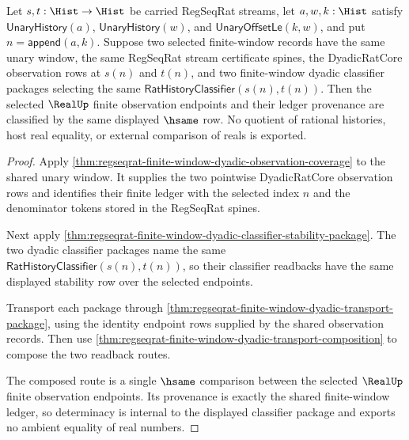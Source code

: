 \begin{theorem}
\label{thm:regseqrat-finite-window-dyadic-classifier-determinacy}
Let $s,t:\Hist\to\Hist$ be carried RegSeqRat streams, let
$a,w,k:\Hist$ satisfy $\mathsf{UnaryHistory}(a)$,
$\mathsf{UnaryHistory}(w)$, and $\mathsf{UnaryOffsetLe}(k,w)$, and put
$n=\mathsf{append}(a,k)$. Suppose two selected finite-window records have the
same unary window, the same RegSeqRat stream certificate spines, the
DyadicRatCore observation rows at $s(n)$ and $t(n)$, and two finite-window
dyadic classifier packages selecting the same
$\mathsf{RatHistoryClassifier}(s(n),t(n))$. Then the selected $\RealUp$ finite
observation endpoints and their ledger provenance are classified by the same
displayed $\hsame$ row. No quotient of rational histories, host real equality,
or external comparison of reals is exported.
\end{theorem}
\begin{proof}
Apply
\autoref{thm:regseqrat-finite-window-dyadic-observation-coverage} to the shared
unary window. It supplies the two pointwise DyadicRatCore observation rows and
identifies their finite ledger with the selected index $n$ and the denominator
tokens stored in the RegSeqRat spines.

Next apply
\autoref{thm:regseqrat-finite-window-dyadic-classifier-stability-package}. The
two dyadic classifier packages name the same
$\mathsf{RatHistoryClassifier}(s(n),t(n))$, so their classifier readbacks have
the same displayed stability row over the selected endpoints.

Transport each package through
\autoref{thm:regseqrat-finite-window-dyadic-transport-package}, using the
identity endpoint rows supplied by the shared observation records. Then use
\autoref{thm:regseqrat-finite-window-dyadic-transport-composition} to compose
the two readback routes.

The composed route is a single $\hsame$ comparison between the selected
$\RealUp$ finite observation endpoints. Its provenance is exactly the shared
finite-window ledger, so determinacy is internal to the displayed classifier
package and exports no ambient equality of real numbers.
\end{proof}

